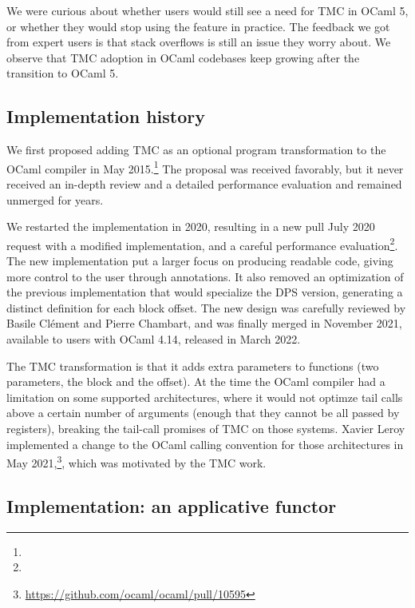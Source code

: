 We were curious about whether users would still see a need for TMC in OCaml 5, or whether they would stop using the feature in practice.
The feedback we got from expert users is that stack overflows is still an issue they worry about.
We observe that TMC adoption in OCaml codebases keep growing after the transition to OCaml 5.

\subsection{Implementation history}
\label{subsec:PR-history}

We first proposed adding TMC as an optional program transformation to
the OCaml compiler in
May 2015.\footnote{}
The proposal was received favorably, but it never received an in-depth
review and a detailed performance evaluation and remained unmerged for
years.

We restarted the implementation in 2020, resulting in a new pull July 2020 request with a modified implementation, and a careful performance
evaluation\footnote{}. The
new implementation put a larger focus on producing readable code,
giving more control to the user through annotations. It also removed
an optimization of the previous implementation that would specialize
the DPS version, generating a distinct definition for each block
offset. The new design was carefully reviewed by Basile Clément and
Pierre Chambart, and was finally merged in November 2021, available to
users with OCaml 4.14, released in March 2022.

The TMC transformation is that it adds extra parameters to functions
(two parameters, the block and the offset). At the time the OCaml
compiler had a limitation on some supported architectures, where it
would not optimze tail calls above a certain number of arguments
(enough that they cannot be all passed by registers), breaking the
tail-call promises of TMC on those systems. Xavier Leroy implemented
a change to the OCaml calling convention for those architectures in
May 2021,\footnote{\url{https://github.com/ocaml/ocaml/pull/10595}},
which was motivated by the TMC work.

\subsection{Implementation: an applicative functor}
\label{subsec:applicative-impl}


